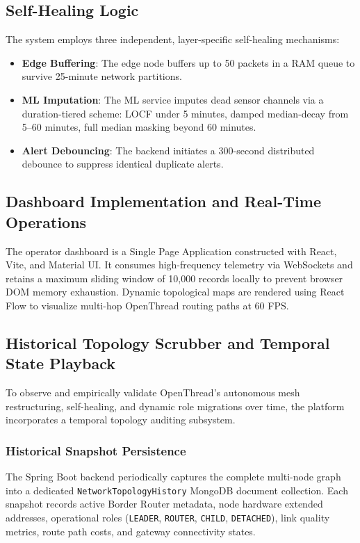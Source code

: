 \documentclass[conference]{IEEEtran}
\begin{document}
\subsection{Self-Healing Logic}
\label{sec:selfheal}
The system employs three independent, layer-specific self-healing mechanisms:
\begin{itemize}
\setlength{\itemsep}{0pt}
\item \textbf{Edge Buffering}: The edge node buffers up to 50 packets in a RAM queue to survive 25-minute network partitions.
\item \textbf{ML Imputation}: The ML service imputes dead sensor channels via a duration-tiered scheme: LOCF under 5 minutes, damped median-decay from 5--60 minutes, full median masking beyond 60 minutes.
\item \textbf{Alert Debouncing}: The backend initiates a 300-second distributed debounce to suppress identical duplicate alerts.
\end{itemize}

\subsection{Dashboard Implementation and Real-Time Operations}
The operator dashboard is a Single Page Application constructed with React, Vite, and Material UI. It consumes high-frequency telemetry via WebSockets and retains a maximum sliding window of 10,000 records locally to prevent browser DOM memory exhaustion. Dynamic topological maps are rendered using React Flow to visualize multi-hop OpenThread routing paths at 60 FPS.

\subsection{Historical Topology Scrubber and Temporal State Playback}
\label{sec:topologyscrubber}
To observe and empirically validate OpenThread's autonomous mesh restructuring, self-healing, and dynamic role migrations over time, the platform incorporates a temporal topology auditing subsystem.

\subsubsection{Historical Snapshot Persistence}
The Spring Boot backend periodically captures the complete multi-node graph into a dedicated \texttt{NetworkTopologyHistory} MongoDB document collection. Each snapshot records active Border Router metadata, node hardware extended addresses, operational roles (\texttt{LEADER}, \texttt{ROUTER}, \texttt{CHILD}, \texttt{DETACHED}), link quality metrics, route path costs, and gateway connectivity states.
\end{document}
